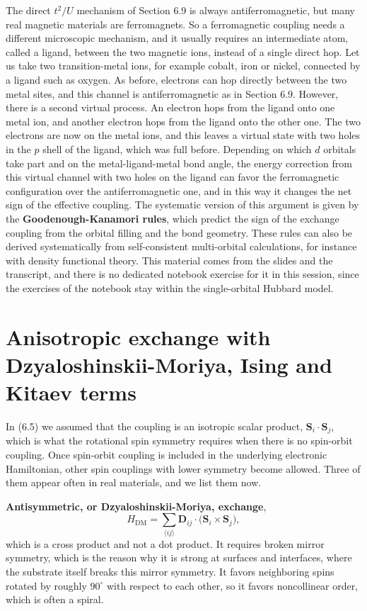 The direct $t^2/U$ mechanism of Section 6.9 is always antiferromagnetic, but many real magnetic
materials are ferromagnets. So a ferromagnetic coupling needs a different microscopic mechanism, and
it usually requires an intermediate atom, called a ligand, between the two magnetic ions, instead of a
single direct hop. Let us take two transition-metal ions, for example cobalt, iron or nickel, connected
by a ligand such as oxygen. As before, electrons can hop directly between the two metal sites, and
this channel is antiferromagnetic as in Section 6.9. However, there is a second virtual process. An
electron hops from the ligand onto one metal ion, and another electron hops from the ligand onto the
other one. The two electrons are now on the metal ions, and this leaves a virtual state with two
holes in the $p$ shell of the ligand, which was full before.
Depending on which $d$ orbitals take part and on the metal-ligand-metal bond angle, the energy
correction from this virtual channel with two holes on the ligand can favor the ferromagnetic
configuration over the antiferromagnetic one, and in this way it changes the net sign of the effective
coupling. The systematic version of this argument is given by the \textbf{Goodenough-Kanamori rules},
which predict the sign of the exchange coupling from the orbital filling and the bond geometry. These
rules can also be derived systematically from self-consistent multi-orbital calculations, for instance
with density functional theory. This material comes from the slides and the transcript, and there is no
dedicated notebook exercise for it in this session, since the exercises of the notebook stay within
the single-orbital Hubbard model.

\section{Anisotropic exchange with Dzyaloshinskii-Moriya, Ising and Kitaev terms}

In (6.5) we assumed that the coupling is an isotropic scalar product, $\mathbf S_i\cdot\mathbf
S_j$, which is what the rotational spin symmetry requires when there is no spin-orbit coupling. Once
spin-orbit coupling is included in the underlying electronic Hamiltonian, other spin couplings with
lower symmetry become allowed. Three of them appear often in real materials, and we list them now.

\textbf{Antisymmetric, or Dzyaloshinskii-Moriya, exchange},
\begin{equation*}
H_\text{DM} = \sum_{\langle ij\rangle} \mathbf D_{ij}\cdot\big(\mathbf S_i\times\mathbf S_j\big),
\end{equation*}
which is a cross product and not a dot product. It requires broken mirror symmetry, which is the
reason why it is strong at surfaces and interfaces, where the substrate itself breaks this mirror
symmetry. It favors neighboring spins rotated by roughly $90^\circ$ with respect to each other, so it
favors noncollinear order, which is often a spiral.


